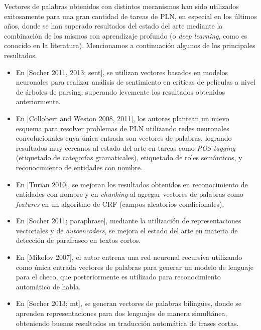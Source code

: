 Vectores de palabras obtenidos con distintos mecanismos han sido utilizados exitosamente para una
gran cantidad de tareas de PLN, en especial en los últimos años, donde se han superado resultados
del estado del arte mediante la combinación de los mismos con aprendizaje profundo (o \textit{deep
learning}, como es conocido en la literatura). Mencionamos a continuación algunos de los principales
resultados.

\begin{itemize}

\item En [Socher 2011, 2013; sent], se utilizan vectores basados en modelos neuronales para realizar
análisis de sentimiento en críticas de películas a nivel de árboles de parsing, superando levemente
los resultados obtenidos anteriormente.

\item En [Collobert and Weston 2008, 2011], los autores plantean un nuevo esquema para resolver
problemas de PLN utilizando redes neuronales convolucionales cuya única entrada son vectores de
palabras, logrando resultados muy cercanos al estado del arte en tareas como \textit{POS tagging}
(etiquetado de categorías gramaticales), etiquetado de roles semánticos, y reconocimiento de
entidades con nombre.

\item En [Turian 2010], se mejoran los resultados obtenidos en reconocimiento de entidades con
nombre y en \textit{chunking} al agregar vectores de palabras como \textit{features} en un algoritmo
de CRF (campos aleatorios condicionales).

\item En [Socher 2011; paraphrase], mediante la utilización de representaciones vectoriales y de
\textit{autoencoders}, se mejora el estado del arte en materia de detección de parafraseo en textos
cortos.

\item En [Mikolov 2007], el autor entrena una red neuronal recursiva utilizando como única entrada
vectores de palabras para generar un modelo de lenguaje para el checo, que posteriormente es
utilizado para reconocimiento automático de habla.

\item En [Socher 2013; mt], se generan vectores de palabras bilingües, donde se aprenden
representaciones para dos lenguajes de manera simultánea, obteniendo buenos resultados en traducción
automática de frases cortas.

\end{itemize}


